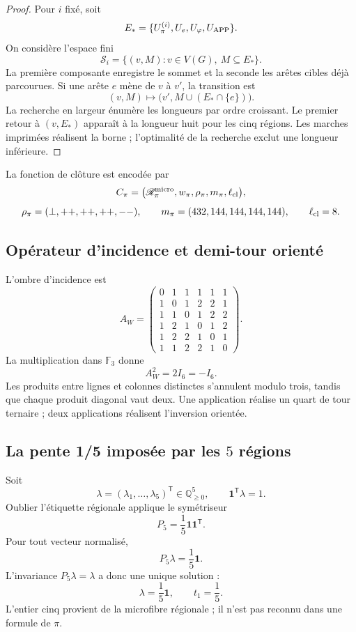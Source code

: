\begin{proof}
Pour \(i\) fixé, soit
\[
 E_*=\{U_\pi^{(i)},U_e,U_\varphi,U_{\rm APP}\}.
\]
On considère l’espace fini
\[
 \mathscr S_i=\{(v,M):v\in V(G),\ M\subseteq E_*\}.
\]
La première composante enregistre le sommet et la seconde les arêtes cibles
déjà parcourues. Si une arête \(e\) mène de \(v\) à \(v'\), la transition est
\[
 (v,M)\longmapsto
 \bigl(v',M\cup(E_*\cap\{e\})\bigr).
\]
La recherche en largeur énumère les longueurs par ordre croissant. Le premier
retour à \((v,E_*)\) apparaît à la longueur huit pour les cinq régions.
Les marches imprimées réalisent la borne ; l’optimalité de la recherche exclut
une longueur inférieure.
\end{proof}

La fonction de clôture est encodée par
\[
 \mathfrak C_\pi=
 \bigl(\mathscr R_\pi^{\rm micro},
 w_\pi,\rho_\pi,m_\pi,\ell_{\rm cl}\bigr),
\]
\[
 \rho_\pi=(\perp,++ ,++ ,++ ,--),
 \qquad
 m_\pi=(432,144,144,144,144),
 \qquad
 \ell_{\rm cl}=8.
\]

\subsection{Opérateur d’incidence et demi-tour orienté}

L’ombre d’incidence est
\[
 A_W=
 \begin{pmatrix}
 0&1&1&1&1&1\\
 1&0&1&2&2&1\\
 1&1&0&1&2&2\\
 1&2&1&0&1&2\\
 1&2&2&1&0&1\\
 1&1&2&2&1&0
 \end{pmatrix}.
\]
La multiplication dans \(\mathbb F_3\) donne
\begin{equation}
 \boxed{A_W^2=2I_6=-I_6.}
 \label{p12-83-c9-s1:eq:aw-cuadrado-menos-identidad-pi}
\end{equation}
Les produits entre lignes et colonnes distinctes s’annulent modulo trois,
tandis que chaque produit diagonal vaut deux. Une application réalise un quart
de tour ternaire ; deux applications réalisent l’inversion orientée.

\subsection{La pente 1/5 imposée par les \(5\) régions}

Soit
\[
 \lambda=(\lambda_1,\ldots,\lambda_5)^{\mathsf T}
 \in\mathbb Q_{\geq0}^5,
 \qquad
 \mathbf1^{\mathsf T}\lambda=1.
\]
Oublier l’étiquette régionale applique le symétriseur
\[
 P_5=\frac15\mathbf1\mathbf1^{\mathsf T}.
\]
Pour tout vecteur normalisé,
\[
 P_5\lambda=\frac15\mathbf1.
\]
L’invariance \(P_5\lambda=\lambda\) a donc une unique solution :
\begin{equation}
 \boxed{\lambda=\frac15\mathbf1,\qquad t_1=\frac15.}
 \label{p12-83-c9-s1:eq:pendiente-primitiva-pi}
\end{equation}
L’entier cinq provient de la microfibre régionale ; il n’est pas reconnu dans une
formule de \(\pi\).

